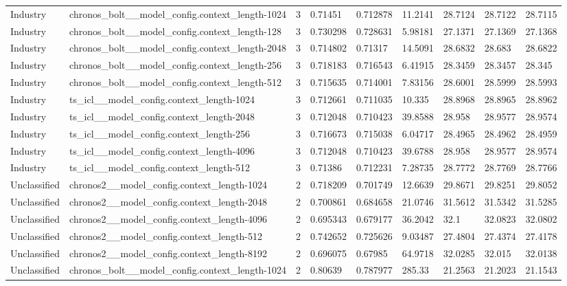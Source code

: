 \begin{tabular}{lllllllll}
Industry & chronos\_bolt\_\_model\_config.context\_length-1024 & 3 & 0.71451 & 0.712878 & 11.2141 & 28.7124 & 28.7122 & 28.7115 \\
Industry & chronos\_bolt\_\_model\_config.context\_length-128 & 3 & 0.730298 & 0.728631 & 5.98181 & 27.1371 & 27.1369 & 27.1368 \\
Industry & chronos\_bolt\_\_model\_config.context\_length-2048 & 3 & 0.714802 & 0.71317 & 14.5091 & 28.6832 & 28.683 & 28.6822 \\
Industry & chronos\_bolt\_\_model\_config.context\_length-256 & 3 & 0.718183 & 0.716543 & 6.41915 & 28.3459 & 28.3457 & 28.345 \\
Industry & chronos\_bolt\_\_model\_config.context\_length-512 & 3 & 0.715635 & 0.714001 & 7.83156 & 28.6001 & 28.5999 & 28.5993 \\
Industry & ts\_icl\_\_model\_config.context\_length-1024 & 3 & 0.712661 & 0.711035 & 10.335 & 28.8968 & 28.8965 & 28.8962 \\
Industry & ts\_icl\_\_model\_config.context\_length-2048 & 3 & 0.712048 & 0.710423 & 39.8588 & 28.958 & 28.9577 & 28.9574 \\
Industry & ts\_icl\_\_model\_config.context\_length-256 & 3 & 0.716673 & 0.715038 & 6.04717 & 28.4965 & 28.4962 & 28.4959 \\
Industry & ts\_icl\_\_model\_config.context\_length-4096 & 3 & 0.712048 & 0.710423 & 39.6788 & 28.958 & 28.9577 & 28.9574 \\
Industry & ts\_icl\_\_model\_config.context\_length-512 & 3 & 0.71386 & 0.712231 & 7.28735 & 28.7772 & 28.7769 & 28.7766 \\
Unclassified & chronos2\_\_model\_config.context\_length-1024 & 2 & 0.718209 & 0.701749 & 12.6639 & 29.8671 & 29.8251 & 29.8052 \\
Unclassified & chronos2\_\_model\_config.context\_length-2048 & 2 & 0.700861 & 0.684658 & 21.0746 & 31.5612 & 31.5342 & 31.5285 \\
Unclassified & chronos2\_\_model\_config.context\_length-4096 & 2 & 0.695343 & 0.679177 & 36.2042 & 32.1 & 32.0823 & 32.0802 \\
Unclassified & chronos2\_\_model\_config.context\_length-512 & 2 & 0.742652 & 0.725626 & 9.03487 & 27.4804 & 27.4374 & 27.4178 \\
Unclassified & chronos2\_\_model\_config.context\_length-8192 & 2 & 0.696075 & 0.67985 & 64.9718 & 32.0285 & 32.015 & 32.0138 \\
Unclassified & chronos\_bolt\_\_model\_config.context\_length-1024 & 2 & 0.80639 & 0.787977 & 285.33 & 21.2563 & 21.2023 & 21.1543 \\

\end{tabular}
